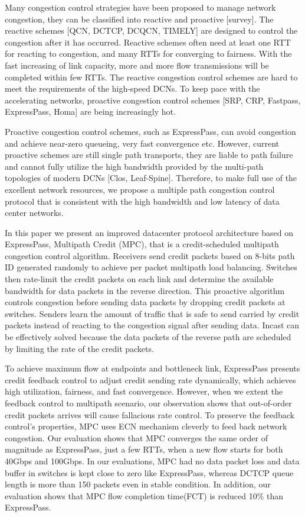 \documentclass[conference,compsoc]{IEEEtran}
\begin{document}
Many congestion control strategies have been proposed to manage network congestion, they can be classified into reactive and proactive [survey]. The reactive schemes [QCN, DCTCP, DCQCN, TIMELY] are designed to control the congestion after it has occurred. Reactive schemes often need at least one RTT for reacting to congestion, and many RTTs for converging to fairness. With the fast increasing of link capacity, more and more flow transmissions will be completed within few RTTs. The reactive congestion control schemes are hard to meet the requirements of the high-speed DCNs. To keep pace with the accelerating networks, proactive congestion control schemes [SRP, CRP, Fastpass, ExpressPass, Homa] are being increasingly hot.

Proactive congestion control schemes, such as ExpressPass, can avoid congestion and achieve near-zero queueing, very fast convergence etc. However, current proactive schemes are still single path transports, they are liable to path failure and cannot fully utilize the high bandwidth provided by the multi-path topologies of modern DCNs [Clos, Leaf-Spine]. Therefore, to make full use of the excellent network resources, we propose a multiple path congestion control protocol that is consistent with the high bandwidth and low latency of data center networks.

In this paper we present an improved datacenter protocol architecture based on ExpressPass, Multipath Credit (MPC), that is a credit-scheduled multipath congestion control algorithm. Receivers send credit packets based on 8-bits path ID generated randomly to achieve per packet multipath load balancing. Switches then rate-limit the credit packets on each link and determine the available bandwidth for data packets in the reverse direction. This proactive algorithm controls congestion before sending data packets by dropping credit packets at switches. Senders learn the amount of traffic that is safe to send carried by credit packets instead of reacting to the congestion signal after sending data. Incast can be effectively solved because the data packets of the reverse path are scheduled by limiting the rate of the credit packets.

To achieve maximum flow at endpoints and bottleneck link, ExpressPass presents credit feedback control to adjust credit sending rate dynamically, which achieves high utilization, fairness, and fast convergence. However, when we extent the feedback control to multipath scenario, our observation shows that out-of-order credit packets arrives will cause fallacious rate control. To preserve the feedback control's properties, MPC uses ECN mechanism cleverly to feed back network congestion. Our evaluation shows that MPC converges the same order of magnitude as ExpressPass, just a few RTTs, when a new flow starts for both 40Gbps and 100Gbps. In our evaluations, MPC had no data packet loss and data buffer in switches is kept close to zero like ExpressPass, whereas DCTCP queue length is more than 150 packets even in stable condition. In addition, our evaluation shows that MPC flow completion time(FCT) is reduced 10\% than ExpressPass.
\end{document}
